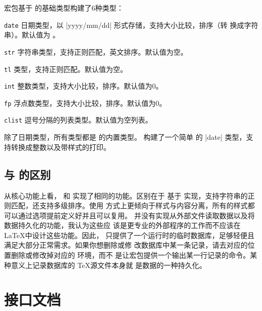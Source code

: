 \documentclass[full]{l3doc}
\begin{document}
\begin{documentation}
宏包基于  的基础类型构建了6种类型：
\begin{Description}
  \item[\texttt{date}]
    日期类型，以 |yyyy/mm/dd| 形式存储，支持大小比较，排序（转
    换成字符串）。默认值为 。
  \item[\texttt{str}]
    字符串类型，支持正则匹配，英文排序。默认值为空。
  \item[\texttt{tl}]
    类型，支持正则匹配。默认值为空。
  \item[\texttt{int}]
    整数类型，支持大小比较，排序。默认值为0。
  \item[\texttt{fp}]
    浮点数类型，支持大小比较，排序。默认值为0。
  \item[\texttt{clist}]
    逗号分隔的列表类型。默认值为空列表。
\end{Description}

除了日期类型，所有类型都是  的内置类型。 构建了一个简单
的 |date| 类型，支持转换成整数以及带样式的打印。

\subsection{与  的区别}


从核心功能上看， 和  实现了相同的功能。区别在于
 基于  实现，支持字符串的正则匹配，还支持多级排序。使用
方式上更倾向于样式与内容分离，所有的样式都可以通过选项提前定义好并且可以复用。
 并没有实现从外部文件读取数据以及将数据持久化的功能，我认为这些应
该是更专业的外部程序的工作而不应该在 \LaTeX 中设计这些功能。因此，
只提供了一个运行时的临时数据库，足够轻便且满足大部分正常需求。如果你想删除或修
改数据库中某一条记录，请去对应的位置删除或修改掉对应的  环境，而不
是让宏包提供一个输出某一行记录的命令。某种意义上记录数据库的 \TeX 源文件本身就
是数据的一种持久化。

\section{接口文档}


\end{documentation}
\end{document}
